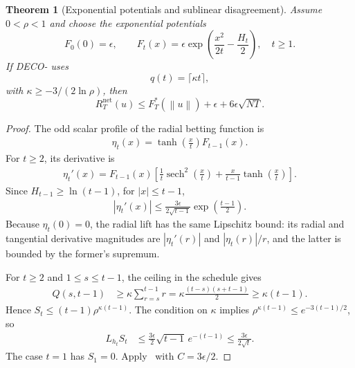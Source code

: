 \documentclass[journal]{IEEEtran}
\newtheorem{theorem}{Theorem}
\newcommand{\br}[1]{\left(#1\right)}
\newcommand{\norm}[1]{\left\lVert{#1}\right\rVert}
\DeclareMathOperator{\sech}{sech}
\newcommand{\algname}{{DECO}\xspace}
\begin{document}
    {\color{blue}
        \begin{theorem}[Exponential potentials and sublinear disagreement]\label{thm:exponential-disagreement}
            Assume $0<\rho<1$ and choose the exponential potentials
            \begin{equation}
                F_0(0)=\epsilon,\qquad
                F_t(x)=\epsilon\exp\br{\frac{x^2}{2t}-\frac{H_t}{2}},\quad t\geq1.
            \end{equation}
            If \algname{}- uses
            \begin{equation}
                q(t)=\lceil\kappa t\rceil,
            \end{equation}
            with $\kappa\geq-3/(2\ln\rho)$, then
            \begin{equation}
                R_T^{\mathrm{net}}(u)
                \leq F_T^*(\norm{u})+\epsilon+6\epsilon\sqrt{NT}.
            \end{equation}
        \end{theorem}
        \begin{proof}
            The odd scalar profile of the radial betting function is
            \begin{align}
                \eta_t(x)=\tanh\br{\frac{x}{t}}F_{t-1}(x).
            \end{align}
            For $t\geq2$, its derivative is
            \begin{align}
                \eta_t'(x)=F_{t-1}(x)\left[
                                         \frac{1}{t}\sech^2\br{\frac{x}{t}}
                                         +\frac{x}{t-1}\tanh\br{\frac{x}{t}}
                                         \right].
            \end{align}
            Since $H_{t-1}\geq\ln(t-1)$, for $|x|\leq t-1$,
            \begin{align}
                |\eta_t'(x)|
                \leq\frac{3\epsilon}{2\sqrt{t-1}}
                \exp\br{\frac{t-1}{2}}.
            \end{align}
            Because $\eta_t(0)=0$, the radial lift has the same Lipschitz bound: its radial and tangential derivative magnitudes are $|\eta_t'(r)|$ and $|\eta_t(r)|/r$, and the latter is bounded by the former's supremum.

            For $t\geq2$ and $1\leq s\leq t-1$, the ceiling in the schedule gives
            \begin{align}
                Q(s,t-1)
                 & \geq\kappa\sum_{r=s}^{t-1}r
                =\kappa\frac{(t-s)(s+t-1)}{2}
                \geq\kappa(t-1).
            \end{align}
            Hence $S_t\leq(t-1)\rho^{\kappa(t-1)}$.
            The condition on $\kappa$ implies $\rho^{\kappa(t-1)}\leq e^{-3(t-1)/2}$, so
            \begin{align}
                L_{h_t}S_t
                 & \leq\frac{3\epsilon}{2}\sqrt{t-1}\,e^{-(t-1)}
                \leq\frac{3\epsilon}{2\sqrt{t}}.
            \end{align}
            The case $t=1$ has $S_1=0$.
            Apply~ with $C=3\epsilon/2$.
        \end{proof}
    }
\end{document}
